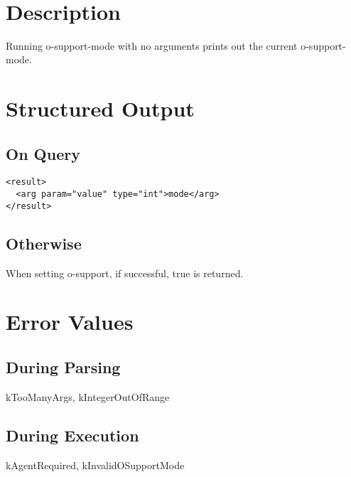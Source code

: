 \documentclass[10pt]{article}
\begin{document}
 \\ 

\section*{ Description }


 Running o-support-mode with no arguments prints out the current o-support-mode. 
\section*{ Structured Output }
\subsection*{ On Query }
\begin{verbatim}
<result>
  <arg param="value" type="int">mode</arg>
</result>

\end{verbatim}
\subsection*{ Otherwise }


 When setting o-support, if successful, true is returned. 
\section*{ Error Values }
\subsection*{ During Parsing }


 kTooManyArgs, kIntegerOutOfRange
\subsection*{ During Execution }


 kAgentRequired, kInvalidOSupportMode
\end{document}
